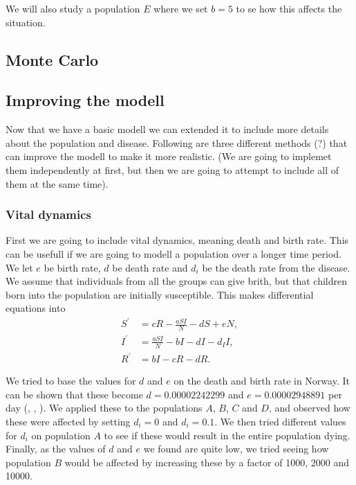 \documentclass[a4paper]{article}
\let\Oldsubsection\subsection
\renewcommand{\subsection}{\FloatBarrier\Oldsubsection}
\let\Oldsubsubsection\subsubsection
\renewcommand{\subsubsection}{\FloatBarrier\Oldsubsubsection}
\begin{document}
We will also study a population $E$ where we set $b=5$ to se how this affects the situation. 


\subsection{Monte Carlo}

\subsection{Improving the modell}

Now that we have a basic modell we can extended it to include more details about the population and disease. Following are three different methods (?) that can improve the modell to make it more realistic. (We are going to implemet them independently at first, but then we are going to attempt to include all of them at the same time).

\subsubsection{Vital dynamics}

First we are going to include vital dynamics, meaning death and birth rate. This can be usefull if we are going to modell a population over a longer time period. We let $e$ be birth rate, $d$ be death rate and $d_i$ be the death rate from the disease. We assume that individuals from all the groups can give brith, but that children born into the population are initially susceptible. This makes differential equations into 
\begin{align} 
S ^ { \prime } & = c R - \frac { a S I } { N } - d S + e N, \\ 
I ^ { \prime } & = \frac { a S I } { N } - b I - d I - d _ { I } I, \\ 
R ^ { \prime } & = b I - c R - d R.
\end{align}

We tried to base the values for $d$ and $e$ on the death and birth rate in Norway. It can be shown that these become $d=0.00002242299$ and $e=0.00002948891$ per day  (\cite{wiki-d.rate}, \cite{ssb-f.rate}, \cite{wb-bef}). We applied these to the populations $A$, $B$, $C$ and $D$, and observed how these were affected by setting $d_i=0$ and $d_i=0.1$. We then tried different values for $d_i$ on population $A$ to see if these would result in the entire population dying. Finally, as the values of $d$ and $e$ we found are quite low, we tried seeing how population $B$ would be affected by increasing these by a factor of 1000, 2000 and 10000. 
\end{document}
